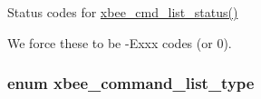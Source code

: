 Status codes for \hyperlink{group__xbee__atcmd_gafb2d1636c675066469ee388170ea27a0}{xbee\-\_\-cmd\-\_\-list\-\_\-status()} 

We force these to be -\/\-Exxx codes (or 0). \hypertarget{group__xbee__atcmd_ga1bd8ecd38c107579d20ded3c79a7d70b}{
\subsubsection[{xbee\-\_\-command\-\_\-list\-\_\-type}]{\setlength{\rightskip}{0pt plus 5cm}enum {\bf xbee\-\_\-command\-\_\-list\-\_\-type}}}\label{group__xbee__atcmd_ga1bd8ecd38c107579d20ded3c79a7d70b}
